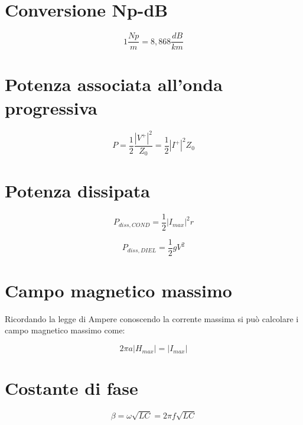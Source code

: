 \documentclass[10pt,a4paper]{report}
\begin{document}
	\section{Conversione Np-dB}

	\begin{equation}
	1\frac{Np}{m}=8,868\frac{dB}{km}
	\end{equation}
	
	\section{Potenza associata all'onda progressiva}

			\begin{equation}
			P=\frac{1}{2}\frac{|V^+|^2}{Z_0}=\frac{1}{2}|I^+|^2 Z_0
			\end{equation}

	\section{Potenza dissipata}

			\begin{equation}
			P_{diss,COND}=\frac{1}{2}|I_{max}|^2 r
			\end{equation}

			\begin{equation}
			P_{diss,DIEL}=\frac{1}{2} g V^2
			\end{equation}

	\section{Campo magnetico massimo}
	
 			Ricordando la legge di Ampere conoscendo la corrente massima si può calcolare i campo magnetico massimo come:

			\begin{equation}
			2 \pi a |H_{max}| = |I_{max}|
			\end{equation}

	\section{Costante di fase}
			\begin{equation}
				\beta=\omega \sqrt{LC}=2 \pi f \sqrt{LC}
			\end{equation}
		
\end{document}
